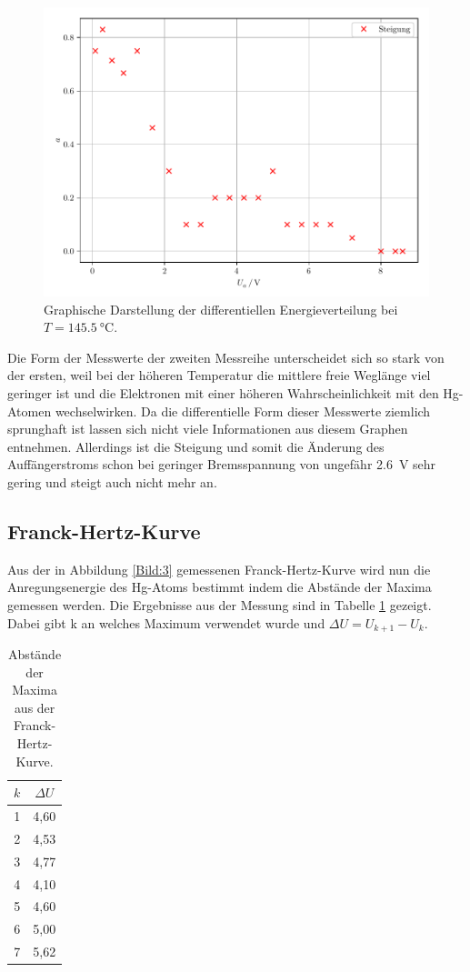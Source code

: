 \begin{figure}[H]
  \includegraphics[width=\textwidth]{plot2.pdf}
  \caption{Graphische Darstellung der differentiellen Energieverteilung bei $T = \SI{145.5}{\celsius}$.}
  \label{abb:5}
\end{figure}

Die Form der Messwerte der zweiten Messreihe unterscheidet sich so stark von der
ersten, weil bei der höheren Temperatur die mittlere freie Weglänge viel geringer ist
und die Elektronen mit einer höheren Wahrscheinlichkeit mit den Hg-Atomen wechselwirken.
Da die differentielle Form dieser Messwerte ziemlich sprunghaft ist lassen sich nicht
viele Informationen aus diesem Graphen entnehmen. Allerdings ist die Steigung und
somit die Änderung des Auffängerstroms schon bei geringer Bremsspannung von ungefähr \SI{2.6}{\volt}
sehr gering und steigt auch nicht mehr an.

\subsection{Franck-Hertz-Kurve}
Aus der in Abbildung \ref{Bild:3} gemessenen Franck-Hertz-Kurve wird nun die Anregungsenergie
des Hg-Atoms bestimmt indem die Abstände der Maxima gemessen werden. Die Ergebnisse
aus der Messung sind in Tabelle \ref{tab:4} gezeigt. Dabei gibt k an welches Maximum verwendet
wurde und $\Delta U = U_{k+1}-U_k$.

\begin{table}[H]
  \centering
  \caption{Abstände der Maxima aus der Franck-Hertz-Kurve.}
  \label{tab:4}
  \begin{tabular}{c c}
    \toprule
    $k$ & $\Delta U$ \\
    \midrule
    1 & 4,60 \\
    2 & 4,53 \\
    3 & 4,77 \\
    4 & 4,10 \\
    5 & 4,60 \\
    6 & 5,00 \\
    7 & 5,62 \\
    \bottomrule
  \end{tabular}
\end{table}

